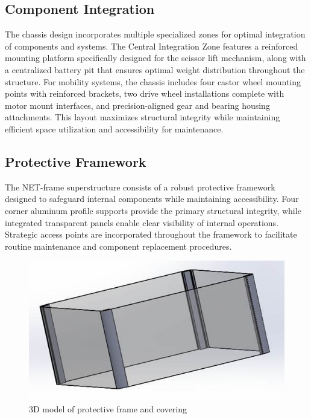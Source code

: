 \documentclass[../../main]{subfiles}
\begin{document}
\subsection{Component Integration}\label{component-integration}

The chassis design incorporates multiple specialized zones for optimal
integration of components and systems. The Central Integration Zone
features a reinforced mounting platform specifically designed for the
scissor lift mechanism, along with a centralized battery pit that
ensures optimal weight distribution throughout the structure. For
mobility systems, the chassis includes four castor wheel mounting points
with reinforced brackets, two drive wheel installations complete with
motor mount interfaces, and precision-aligned gear and bearing housing
attachments. This layout maximizes structural integrity while
maintaining efficient space utilization and accessibility for
maintenance.

\subsection{Protective Framework}\label{protective-framework}

The NET-frame superstructure consists of a robust protective framework
designed to safeguard internal components while maintaining
accessibility. Four corner aluminum profile supports provide the primary
structural integrity, while integrated transparent panels enable clear
visibility of internal operations. Strategic access points are
incorporated throughout the framework to facilitate routine maintenance
and component replacement procedures.

\begin{figure}[h!]
  \centering
  \includegraphics[width=\textwidth]{img/image112.jpg}
  \caption{3D model of protective frame and covering}
  \end{figure}
  
\end{document}

